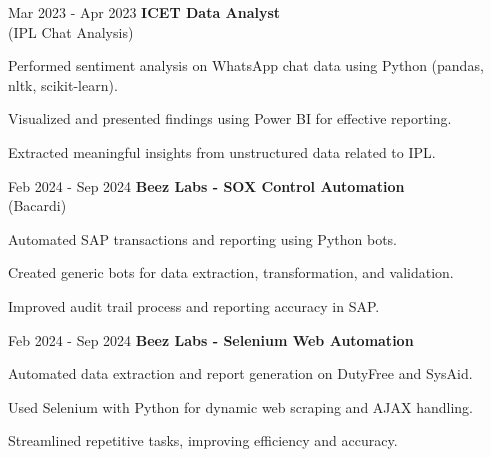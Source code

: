 \vspace{0.2 cm}
\begin{twocolentry}{Mar 2023 - Apr 2023}
\textbf{ICET Data Analyst} \\ (IPL Chat Analysis)\end{twocolentry}
\vspace{0.10 cm}
\begin{onecolentry}
\begin{highlights}
\item Performed sentiment analysis on WhatsApp chat data using Python (pandas, nltk, scikit-learn).
\item Visualized and presented findings using Power BI for effective reporting.
\item Extracted meaningful insights from unstructured data related to IPL.
\end{highlights}
\end{onecolentry}
\vspace{0.2 cm}
\begin{twocolentry}{Feb 2024 - Sep 2024}
\textbf{Beez Labs - SOX Control Automation} \\ (Bacardi)\end{twocolentry}
\vspace{0.10 cm}
\begin{onecolentry}
\begin{highlights}
\item Automated SAP transactions and reporting using Python bots.
\item Created generic bots for data extraction, transformation, and validation.
\item Improved audit trail process and reporting accuracy in SAP.
\end{highlights}
\end{onecolentry}
\vspace{0.2 cm}
\begin{twocolentry}{Feb 2024 - Sep 2024}
\textbf{Beez Labs - Selenium Web Automation}\end{twocolentry}
\vspace{0.10 cm}
\begin{onecolentry}
\begin{highlights}
\item Automated data extraction and report generation on DutyFree and SysAid.
\item Used Selenium with Python for dynamic web scraping and AJAX handling.
\item Streamlined repetitive tasks, improving efficiency and accuracy.
\end{highlights}
\end{onecolentry}
